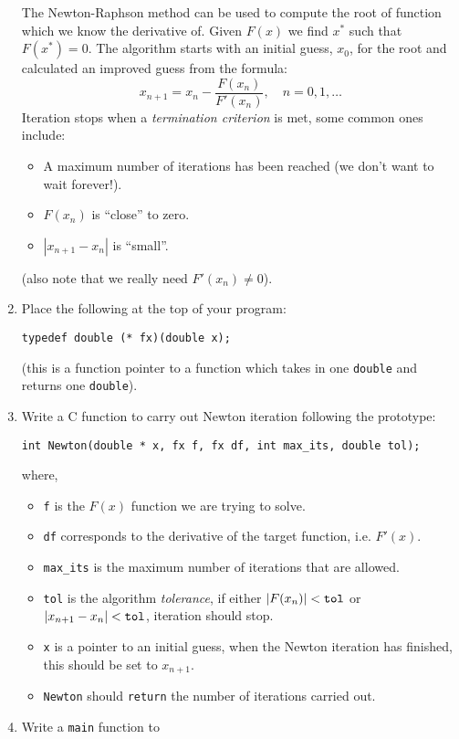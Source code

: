 \documentclass[a4paper,12pt]{article}
\begin{document}
\begin{enumerate}
The Newton-Raphson method can be used to compute the root of function which we know the derivative of. Given $F(x)$ we find $x^*$ such that $F(x^*) = 0$. The algorithm starts with an initial guess, $x_0$, for the root and calculated an improved guess from the formula:
\begin{equation}
x_{n+1} = x_n - \frac{F(x_n)}{F'(x_n)}, \quad n = 0,1,\ldots
\end{equation}
Iteration stops when a \emph{termination criterion} is met, some common ones include:
\begin{itemize}
\item A maximum number of iterations has been reached (we don't want to wait forever!).
\item $F(x_n)$ is ``close'' to zero.
\item $|x_{n+1}-x_n|$ is ``small''.
\end{itemize}
(also note that we really need $F'(x_n) \neq 0$).
\item Place the following at the top of your program:
\begin{center}
\tt typedef double (* fx)(double x);
\end{center}
(this is a function pointer to a function which takes in one {\tt double} and returns one {\tt double}).
\item Write a C function to carry out Newton iteration following the prototype:
\begin{center}
\tt int Newton(double * x, fx f, fx df, int max\_its, double tol);
\end{center}
where,
\begin{itemize}
\item {\tt f} is the $F(x)$ function we are trying to solve.
\item {\tt df} corresponds to the derivative of the target function, i.e. $F'(x)$.
\item {\tt max\_its} is the maximum number of iterations that are allowed.
\item {\tt tol} is the algorithm \emph{tolerance}, if either $|F(x_n)| < \mathrm{\tt tol}$ or $|x_{n+1}-x_n| < \mathrm{\tt tol}$, iteration should stop.
\item {\tt x} is a pointer to an initial guess, when the Newton iteration has finished, this should be set to $x_{n+1}$.
\item {\tt Newton} should {\tt return} the number of iterations carried out. \end{itemize}
\item Write a {\tt main} function to

\end{enumerate}
\end{document}
